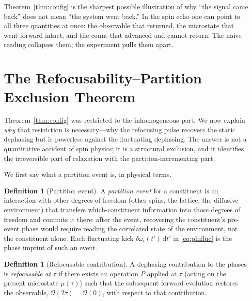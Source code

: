 \documentclass[11pt,a4paper]{article}
\theoremstyle{thmstyle}
\theoremstyle{definition}
\newtheorem{definition}[theorem]{Definition}
\theoremstyle{remark}
\newcommand{\Obs}{\mathcal{O}}
\newcommand{\Mic}{\mu}
\begin{document}
Theorem~\ref{thm:config} is the sharpest possible illustration of why
``the signal came back'' does not mean ``the system went back.'' In the
spin echo one can point to all three quantities at once: the observable
that returned, the microstate that went forward intact, and the count
that advanced and cannot return. The naive reading collapses them; the
experiment pulls them apart.

\section{The Refocusability--Partition Exclusion Theorem}
\label{sec:exclusion}

Theorem~\ref{thm:config} was restricted to the inhomogeneous part. We now
explain \emph{why} that restriction is necessary---why the refocusing
pulse recovers the static dephasing but is powerless against the
fluctuating dephasing. The answer is not a quantitative accident of spin
physics; it is a structural exclusion, and it identifies the irreversible
part of relaxation with the partition-incrementing part.

We first say what a partition event is, in physical terms.

\begin{definition}[Partition event]
\label{def:partition-event}
A \emph{partition event} for a constituent is an interaction with other
degrees of freedom (other spins, the lattice, the diffusive environment)
that transfers which-constituent information into those degrees of
freedom and commits it there: after the event, recovering the
constituent's pre-event phase would require reading the correlated state
of the environment, not the constituent alone. Each fluctuating kick
$\delta\omega_{i}(t')\,\mathrm{d}t'$ in \eqref{eq:phifluc} is the
phase imprint of such an event.
\end{definition}

\begin{definition}[Refocusable contribution]
\label{def:refocusable}
A dephasing contribution to the phases is \emph{refocusable at $\tau$} if
there exists an operation $P$ applied at $\tau$ (acting on the present
microstate $\Mic(\tau)$) such that the subsequent forward evolution
restores the observable, $\Obs(2\tau)=\Obs(0)$, with respect to that
contribution.
\end{definition}
\end{document}
